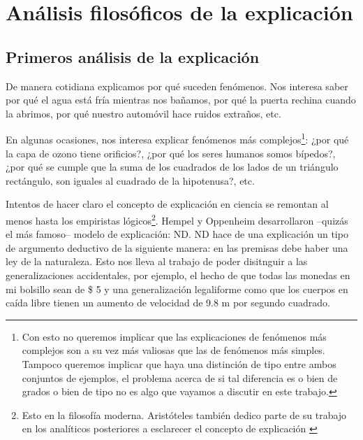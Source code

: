 \chapter{Análisis filosóficos de la explicación}


\section{Primeros análisis de la explicación}

\noindent De manera cotidiana explicamos por qué suceden fenómenos. Nos interesa saber por qué el agua está fría mientras nos bañamos, por qué la puerta rechina cuando la abrimos, por qué nuestro automóvil hace ruidos extraños, etc.

En algunas ocasiones, nos interesa explicar fenómenos más complejos\footnote{Con esto no queremos implicar que las explicaciones de fenómenos más complejos son a su vez más valiosas que las de fenómenos más simples. Tampoco queremos implicar que haya una distinción de tipo entre ambos conjuntos de ejemplos, el problema acerca de si tal diferencia es o bien de grados o bien de tipo no es algo que vayamos a discutir en este trabajo.}: ¿por qué la capa de ozono tiene orificios?, ¿por qué los seres humanos somos bípedos?, ¿por qué se cumple que la suma de los cuadrados de los lados de un triángulo rectángulo, son iguales al cuadrado de la hipotenusa?, etc.


Intentos de hacer claro el concepto de explicación en ciencia se remontan al menos hasta los empiristas lógicos\footnote{Esto en la filosofía moderna. Aristóteles también dedico parte de su trabajo en los analíticos posteriores a esclarecer el concepto de explicación \cite{Aristoteles2009}}. Hempel y Oppenheim desarrollaron --quizás el más famoso-- modelo de explicación: ND. ND hace de una explicación un tipo de argumento deductivo de la siguiente manera: en las premisas debe haber una ley de la naturaleza. Esto nos lleva al trabajo de poder disitnguir a las generalizaciones accidentales, por ejemplo, el hecho de que todas las monedas en mi bolsillo sean de \$ 5 y una generalización legaliforme como que los cuerpos en caída libre tienen un aumento de velocidad de 9.8 m por segundo cuadrado.


